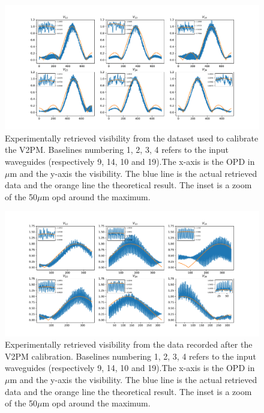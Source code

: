 \begin{figure}[htbp!]
 \centering
 \includegraphics[scale=.4]{../picture/retrieve_visi_expe.pdf}
 \caption{Experimentally retrieved visibility from the dataset used to calibrate the V2PM. Baselines numbering 1, 2, 3, 4 refers to the input waveguides (respectively  9, 14, 10 and 19).The x-axis is the OPD in $\mu$m and the y-axis the visibility. The blue line is the actual retrieved data and the orange line the theoretical result. The inset is a zoom of the 50$\mu$m opd around the maximum. }
 \label{fig:retrieved_visi_expe}
\end{figure}

\begin{figure}[htbp!]
 \centering
 \includegraphics[scale=.4]{../picture/retrieve_visi_expe2.pdf}
 \caption{Experimentally retrieved visibility from the data recorded after the V2PM calibration. Baselines numbering 1, 2, 3, 4 refers to the input waveguides (respectively  9, 14, 10 and 19).The x-axis is the OPD in $\mu$m and the y-axis the visibility. The blue line is the actual retrieved data and the orange line the theoretical result. The inset is a zoom of the 50$\mu$m opd around the maximum. }
 \label{fig:retrieved_visi_expe2}
\end{figure}

